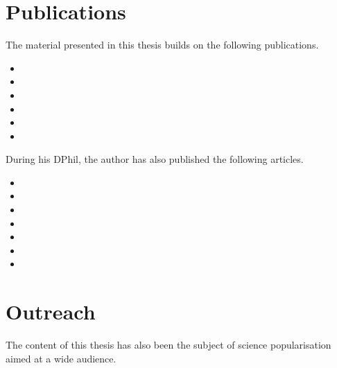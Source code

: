 \section*{Publications}

The material presented in this thesis builds on the following publications.
\begin{itemize}[label={}]
\item {}\vspace{-10pt}
\item {}\vspace{-10pt}
\item {}\vspace{-10pt}
\item {}\vspace{-10pt}
\item {}\vspace{-10pt}
\item {}
\end{itemize}\vspace{10pt}
During his DPhil, the author has also published the following articles.
\begin{itemize}[label={}]
\item {}\vspace{-10pt}
\item {}\vspace{-10pt}
\item {}\vspace{-10pt}
\item {}\vspace{5pt}
\item {}\vspace{5pt}
\item {}\vspace{-10pt}
\item {}\vspace{-10pt}
\end{itemize}

\section*{Outreach}

The content of this thesis has also been the subject of science popularisation aimed at a wide audience.

